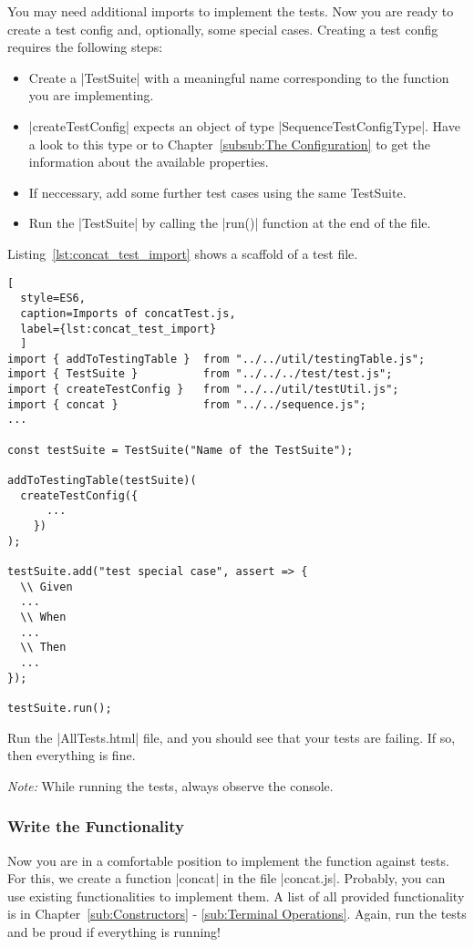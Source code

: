 You may need additional imports to implement the tests.
\newline
Now you are ready to create a test config and, optionally, some special cases.
Creating a test config requires the following steps:

\begin{itemize}
  \item{Create a |TestSuite| with a meaningful name corresponding to the function you are implementing.}
  \item{|createTestConfig| expects an object of type |SequenceTestConfigType|. Have a look
    to this type or to Chapter~\ref{subsub:The Configuration} to get the information about the available properties. }
      \item{If neccessary, add some further test cases using the same TestSuite.}
  \item{Run the |TestSuite| by calling the |run()| function at the end of the file. }
\end{itemize}

Listing~\ref{lst:concat_test_import} shows a scaffold of a test file. 

\begin{lstlisting}[
  style=ES6, 
  caption=Imports of concatTest.js,
  label={lst:concat_test_import}
  ]
import { addToTestingTable }  from "../../util/testingTable.js";
import { TestSuite }          from "../../../test/test.js";
import { createTestConfig }   from "../../util/testUtil.js";
import { concat }             from "../../sequence.js";
...

const testSuite = TestSuite("Name of the TestSuite");

addToTestingTable(testSuite)(
  createTestConfig({
      ...
    })
);

testSuite.add("test special case", assert => {
  \\ Given
  ...
  \\ When
  ...
  \\ Then
  ...
});

testSuite.run();
\end{lstlisting}

Run the |AllTests.html| file, and you should see that your tests are failing.
If so, then everything is fine.

\textit{Note:} While running the tests, always observe the console.

\subsubsection{Write the Functionality}
Now you are in a comfortable position to implement the function against tests.
For this, we create a function |concat| in the file |concat.js|.
Probably, you can use existing functionalities to implement them. A list of all
provided functionality is in Chapter~\ref{sub:Constructors} - \ref{sub:Terminal Operations}.
\newline
Again, run the tests and be proud if everything is running!
